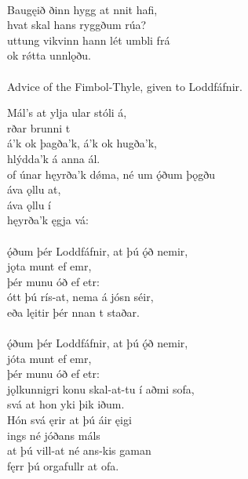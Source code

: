  \\

\bva Baugęið ðinn \hld hygg at nnit hafi, \\%
\ind hvat skal hans ryggðum rúa? \\%
uttung vikvinn \hld hann lét umbli frá \\%
\ind ok rǿtta unnlǫðu.\\%

 \\

	Advice of the Fimbol-Thyle, given to Loddfáfnir.

\bva Mál's at ylja \hld {}ular stóli á, \\%
\ind {}rðar brunni t \\%
á'k ok þagða'k, \hld {}á'k ok hugða'k, \\%
\ind hlýdda'k á anna ál. \\%
of únar hęyrða'k dǿma, \hld né um ǫ́ðum þǫgðu \\%
\ind {}áva ǫllu at, \\%
\ind {}áva ǫllu í \\%
\ind hęyrða'k ęgja vá:\\%

 \\

\bva {}ǫ́ðum þér Loddfáfnir, \hld at þú ǫ́ð nemir, \\%
\ind {}jǫta munt ef emr, \\%
\ind þér munu óð ef etr: \\%
ótt þú rís-at, \hld nema á jósn séir, \\%
\ind eða lęitir þér nnan t staðar.\\%

 \\

\bva {}ǫ́ðum þér Loddfáfnir, \hld at þú ǫ́ð nemir, \\%
\ind {}jóta munt ef emr, \\%
\ind þér munu óð ef etr: \\%
jǫlkunnigri konu \hld skal-at-tu í aðmi sofa, \\%
\ind svá at hon yki þik iðum. \\%
Hón svá ęrir \hld at þú áir ęigi \\%
\ind {}ings né jóðans máls \\%
at þú vill-at \hld né ans-kis gaman \\%
\ind fęrr þú orgafullr at ofa.\\%

